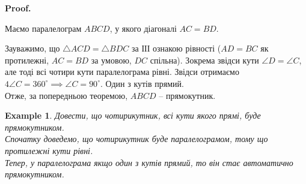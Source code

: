 \documentclass[a4paper, 10pt]{article}
\makeatletter
\def\qed{$\blacksquare$}
\theoremstyle{theoremdd}
\theoremstyle{theoremdd}
\theoremstyle{theoremdd}
\theoremstyle{theoremdd}
\theoremstyle{theoremdd}
\newtheorem{example}[theorem]{Example}
\theoremstyle{theoremdd}
\theoremstyle{theoremdd}
\theoremstyle{theoremdd}
\theoremstyle{theoremdd}
\renewenvironment{proof}[1][Proof.\\]{\par
\pushQED{\hfill \qed}%
\normalfont \topsep6\p@\@plus6\p@\relax
\trivlist
\item\relax
{\bfseries
#1\@addpunct{.}}\hspace\labelsep\ignorespaces
}{%
\popQED\endtrivlist\@endpefalse
}
\makeatother
\begin{document}
\begin{proof}
Маємо паралелограм $ABCD$, у якого діагоналі $AC = BD$.
\begin{figure}[H]
\centering
{}
\end{figure}
Зауважимо, що $\triangle ACD = \triangle BDC$ за ІІІ ознакою рівності ($AD = BC$ як протилежні, $AC = BD$ за умовою, $DC$ спільна). Зокрема звідси кути $\angle D = \angle C$, але тоді всі чотири кути паралелограма рівні. Звідси отримаємо $4 \angle C = 360^\circ \implies \angle C = 90^\circ$. Один з кутів прямий. \\
Отже, за попередньою теоремою, $ABCD$ -- прямокутник.
\end{proof}

\begin{example}
Довести, що чотирикутник, всі кути якого прямі, буде прямокутником.\\
Спочатку доведемо, що чотирикутник буде паралелограмом, тому що протилежні кути рівні.\\
Тепер, у паралелограма якщо один з кутів прямий, то він стає автоматично прямокутником.
\end{example}
\end{document}
